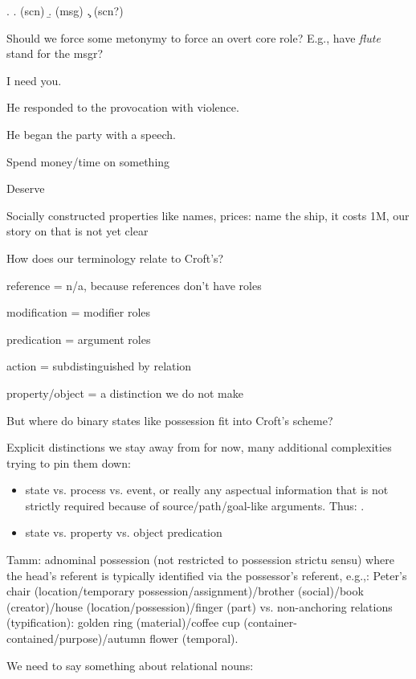 \documentclass[a4paper]{article}
\begin{document}
\ex. \a.  (scn)
     \b.  (msg)
     \c.  (scn?)

Should we force some metonymy to force an overt core role? E.g., have \emph{flute} stand for the msgr?

I need you.

He responded to the provocation with violence.

He began the party with a speech.

Spend money/time on something

Deserve

Socially constructed properties like names, prices: name the ship, it costs 1M, our story on that is not yet clear

How does our terminology relate to Croft's?

reference = n/a, because references don't have roles

modification = modifier roles

predication = argument roles

action = subdistinguished by relation

property/object = a distinction we do not make

But where do binary states like possession fit into Croft's scheme?

Explicit distinctions we stay away from for now, many additional complexities
trying to pin them down:

\begin{itemize}
    \item state vs. process vs. event, or really any aspectual information that
        is not strictly required because of source/path/goal-like arguments.
        Thus: .
    \item state vs. property vs. object predication
\end{itemize}

Tamm: adnominal possession (not restricted to possession strictu sensu) where
the head's referent is typically identified via the possessor's referent,
e.g.,: Peter's chair (location/temporary possession/assignment)/brother
(social)/book (creator)/house (location/possession)/finger (part) vs.
non-anchoring relations (typification): golden ring (material)/coffee cup
(container-contained/purpose)/autumn flower (temporal).

We need to say something about relational nouns:

\end{document}
